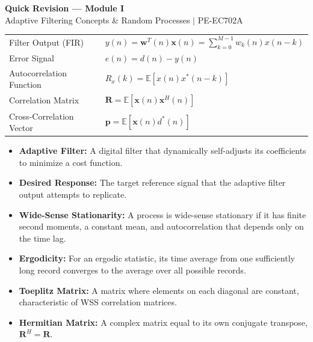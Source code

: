 \documentclass[12pt,a4paper]{article}
\renewcommand{\arraystretch}{1.45}
\begin{document}
\newpage
\begin{center}
  {\large\bfseries\color{myred} Quick Revision --- Module I}\\[3pt]
  {\small\color{mydark} Adaptive Filtering Concepts \& Random Processes $|$ PE-EC702A}
\end{center}
\noindent{\color{myred}\rule{\linewidth}{1.2pt}}
\vspace{4pt}

\begin{tcolorbox}[formulabox, title={\textbf{Key Formulas at a Glance}}]
\renewcommand{\arraystretch}{1.3}
\begin{tabularx}{\linewidth}{B{4.5cm} X}Filter Output (FIR) & $y(n) = \mathbf{w}^T(n)\mathbf{x}(n) = \sum_{k=0}^{M-1} w_k(n) x(n-k)$ \\[6pt]
Error Signal & $e(n) = d(n) - y(n)$ \\[6pt]
Autocorrelation Function & $R_x(k) = \mathbb{E}[x(n) x^*(n-k)]$ \\[6pt]
Correlation Matrix & $\mathbf{R} = \mathbb{E}[\mathbf{x}(n) \mathbf{x}^H(n)]$ \\[6pt]
Cross-Correlation Vector & $\mathbf{p} = \mathbb{E}[\mathbf{x}(n) d^*(n)]$
\end{tabularx}
\end{tcolorbox}

\begin{tcolorbox}[defbox, title={\textbf{One-Line Definitions}}]
\begin{itemize}[leftmargin=*, itemsep=2.5pt, topsep=0pt]
  \item \textbf{Adaptive Filter:} A digital filter that dynamically self-adjusts its coefficients to minimize a cost function.
  \item \textbf{Desired Response:} The target reference signal that the adaptive filter output attempts to replicate.
  \item \textbf{Wide-Sense Stationarity:} A process is wide-sense stationary if it has finite second moments, a constant mean, and autocorrelation that depends only on the time lag.
  \item \textbf{Ergodicity:} For an ergodic statistic, its time average from one sufficiently long record converges to the average over all possible records.
  \item \textbf{Toeplitz Matrix:} A matrix where elements on each diagonal are constant, characteristic of WSS correlation matrices.
  \item \textbf{Hermitian Matrix:} A complex matrix equal to its own conjugate transpose, $\mathbf{R}^H = \mathbf{R}$.
\end{itemize}
\end{tcolorbox}
\end{document}
